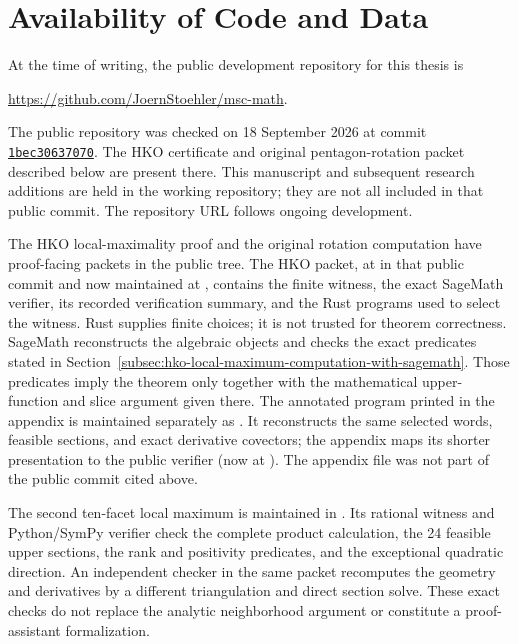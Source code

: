 \section{Availability of Code and Data}\label{sec:published-code-data}

At the time of writing, the public development repository for this thesis is
\begin{center}
  \url{https://github.com/JoernStoehler/msc-math}.
\end{center}
The public repository was checked on 18 September 2026 at commit
\href{https://github.com/JoernStoehler/msc-math/tree/1bec30637070effe7ab8b0a022ae62e83f6bbcab}{\texttt{1bec30637070}}. The HKO certificate and original
pentagon-rotation packet described below are present there. This manuscript and subsequent
research additions are held in the working repository; they are not all included
in that public commit. The repository URL follows ongoing development.

\begin{sloppypar}
The HKO local-maximality proof and the original rotation computation have
proof-facing packets in the public tree.  The HKO packet, at
 in that public commit and now maintained at
, contains the finite witness, the
exact SageMath verifier, its recorded verification summary, and the Rust
programs used to select the witness.  Rust supplies finite choices; it is not
trusted for theorem correctness.  SageMath reconstructs the algebraic objects
and checks the exact predicates stated in
Section~\ref{subsec:hko-local-maximum-computation-with-sagemath}.  Those
predicates imply the theorem only together with the mathematical
upper-function and slice argument given there.
The annotated program printed in the appendix is maintained separately as
. It reconstructs the same selected
words, feasible sections, and exact derivative covectors; the appendix maps
its shorter presentation to the public verifier
(now at ).
The appendix file was not part of the public commit cited above.

The second ten-facet local maximum is maintained in
. Its rational witness and
Python/SymPy verifier check the complete product calculation, the 24 feasible
upper sections, the rank and positivity predicates, and the exceptional
quadratic direction. An independent checker in the same packet recomputes the
geometry and derivatives by a different triangulation and direct section
solve. These exact checks do not replace the analytic neighborhood argument
or constitute a proof-assistant formalization.

\end{sloppypar}

